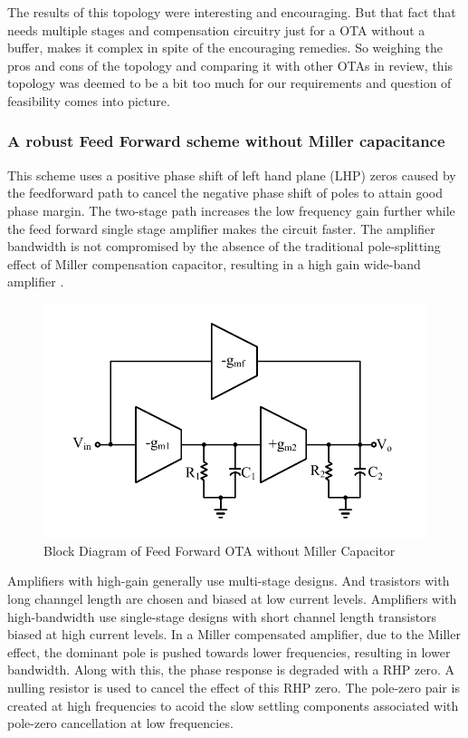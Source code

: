 The results of this topology were interesting and encouraging. But that fact that needs multiple stages and compensation circuitry just for a OTA without a buffer, makes it complex in spite of the encouraging remedies. So weighing the pros and cons of the topology and comparing it with other OTAs in review, this topology was deemed to be a bit too much for our requirements and question of feasibility comes into picture.

\subsubsection{A robust Feed Forward scheme without Miller capacitance}

This scheme uses a positive phase shift of left hand plane (LHP) zeros caused by the feedforward path to cancel the negative phase shift of poles to attain good phase margin. The two-stage path increases the low frequency gain further  while the feed forward single stage amplifier makes the circuit faster. The amplifier bandwidth is not compromised by the absence of the traditional pole-splitting effect of Miller compensation capacitor, resulting in a high gain wide-band amplifier \cite{robust_feed_fwd}.

\begin{figure} [H]
\centering
\includegraphics[scale=1]{Figures/Misc/PDFs/FFNMCO.pdf}
\caption{Block Diagram of Feed Forward OTA without Miller Capacitor}
\label{fig:FFMNCO}
\end{figure}

Amplifiers with high-gain generally use multi-stage designs. And trasistors with long channgel length are chosen and biased at low current levels. Amplifiers with high-bandwidth use single-stage designs with short channel length transistors biased at high current levels. In a Miller compensated amplifier, due to the Miller effect, the dominant pole is pushed towards lower frequencies, resulting in lower bandwidth. Along with this, the phase response is degraded with a RHP zero. A nulling resistor is used to cancel the effect of this RHP zero. The pole-zero pair is created at high frequencies to acoid the slow settling components associated with pole-zero cancellation at low frequencies. 

